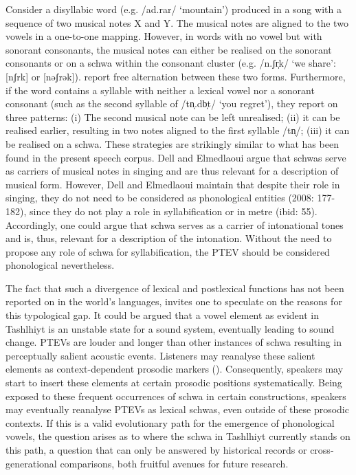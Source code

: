 \largerpage
Consider a disyllabic word (e.g. /ad.rar/ ‘mountain’) produced in a song with a sequence of two musical notes X and Y. The musical notes are aligned to the two vowels in a one-to-one mapping. However, in words with no vowel but with sonorant consonants, the musical notes can either be realised on the sonorant consonants or on a schwa within the consonant cluster (e.g. /n.ʃr̩k/ ‘we share’: [nʃrk] or [nəʃrək]). \citet{DE2008} report free alternation between these two forms. Furthermore, if the word contains a syllable with neither a lexical vowel nor a sonorant consonant (such as the second syllable of /tn̩.db̩t/ ‘you regret’), they report on three patterns: (i) The second musical note can be left unrealised; (ii) it can be realised earlier, resulting in two notes aligned to the first syllable /tn̩/; (iii) it can be realised on a schwa. These strategies are strikingly similar to what has been found in the present speech corpus. Dell and Elmedlaoui argue that schwas serve as carriers of musical notes in singing and are thus relevant for a description of musical form. However, Dell and Elmedlaoui maintain that despite their role in singing, they do not need to be considered as phonological entities (2008: 177-182), since they do not play a role in syllabification or in metre (ibid: 55). Accordingly, one could argue that schwa serves as a carrier of intonational tones and is, thus, relevant for a description of the intonation. Without the need to propose any role of schwa for syllabification, the PTEV should be considered phonological nevertheless.

The fact that such a divergence of lexical and postlexical functions has not been reported on in the world’s languages, invites one to speculate on the reasons for this typological gap. It could be argued that a vowel element as evident in Tashlhiyt is an unstable state for a sound system, eventually leading to sound change. PTEVs are louder and longer than other instances of schwa resulting in perceptually salient acoustic events. Listeners may reanalyse these salient elements as context-dependent prosodic markers (\citealt[318]{BrowmanGoldstein1990}). Consequently, speakers may start to insert these elements at certain prosodic positions systematically. Being exposed to these frequent occurrences of schwa in certain constructions, speakers may eventually reanalyse PTEVs as lexical schwas, even outside of these prosodic contexts. If this is a valid evolutionary path for the emergence of phonological vowels, the question arises as to where the schwa in Tashlhiyt currently stands on this path, a question that can only be answered by historical records or cross-generational comparisons, both fruitful avenues for future research.

